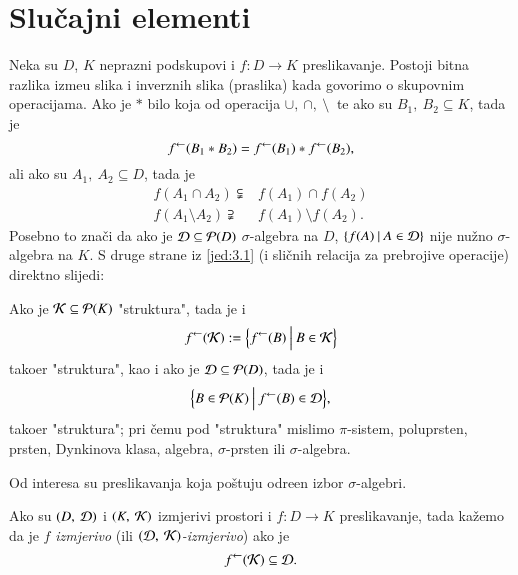 \usetikzlibrary{arrows,chains,matrix,positioning,scopes}

\chapter{Slu\v cajni elementi} \label{poglavlje3}

Neka su $D$, $K$ neprazni podskupovi i $f: D \to K$ preslikavanje.
Postoji bitna razlika izme\dj u slika i inverznih slika (praslika) kada govorimo o skupovnim operacijama. Ako je $*$ bilo koja od operacija $\cup, \: \cap, \: \setminus \:$ te ako su $B_1, \: B_2 \subseteq K$, tada je
\begin{equation} \label{jed:3.1}
    {f}^{\leftarrow} (B_1 * B_2) = {f}^{\leftarrow}(B_1) * {f}^{\leftarrow}(B_2),
\end{equation}
ali ako su $A_1, \: A_2 \subseteq D$, tada je
\begin{align*}
    f(A_1 \cap A_2) \subsetneqq& f(A_1) \cap f(A_2) \\
    f(A_1 \setminus A_2) \supsetneqq& f(A_1) \setminus f(A_2). 
\end{align*}
Posebno to zna\v ci da ako je $\mathcal{D} \subseteq \mathcal{P}({D})$ $\sigma$-algebra na $D$, $\{{f(A)} \: | \: {A \in \mathcal{D}}\}$ nije nu\v zno $\sigma$-algebra na $K$.
S druge strane iz \eqref{jed:3.1} (i sli\v cnih relacija za prebrojive operacije) direktno slijedi:

Ako je $\mathcal{K} \subseteq \mathcal{P}({K})$ "struktura", tada je i
\begin{equation} \label{jed:3.2}
    {f}^{\leftarrow}(\mathcal{K}) := \Big\{ {{f}^{\leftarrow}(B)} \: \Big| \: {B \in
        \mathcal{K}} \Big\}
\end{equation}
tako\dj er "struktura", kao i ako je $\mathcal{D} \subseteq \mathcal{P}({D})$, tada je i
\begin{equation} \label{jed:3.3}
    \Big\{ {B \in \mathcal{P}({K})} \: \Big| \: {{f}^{\leftarrow}(B) \in \mathcal{D}} \Big\},
\end{equation}
tako\dj er "struktura"; pri \v cemu pod "struktura" mislimo $\pi$-sistem, poluprsten, prsten, Dynkinova klasa, algebra, $\sigma$-prsten ili $\sigma$-algebra.

Od interesa su preslikavanja koja po\v stuju odre\dj en
izbor $\sigma$-algebri.
\begin{defn}    \label{defn:3.3-1}
    Ako su $(D, \: \mathcal{D})$ i $(K, \: \mathcal{K})$ izmjerivi prostori i $f: D \to K$ preslikavanje, tada ka\v zemo da je $f$ \emph{izmjerivo} (ili \emph{$(\mathcal{D}, \: \mathcal{K})$-izmjerivo}) ako je
    \begin{equation*}
        {f}^{\leftarrow}(\mathcal{K}) \subseteq \mathcal{D}.
    \end{equation*}
\end{defn}

